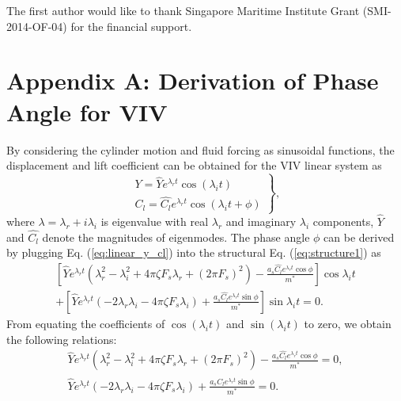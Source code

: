 \documentclass{jfm}
\begin{document}
The first author would like to thank Singapore Maritime Institute Grant (SMI-2014-OF-04) 
for the financial support.

\appendix
\renewcommand\thefigure{B.\arabic{figure}}
\renewcommand{\theequation}{A.\arabic{equation}}
\section*{Appendix A: Derivation of Phase Angle for VIV}
By considering the cylinder motion and fluid forcing as sinusoidal functions, the displacement and lift coefficient can be obtained  for the VIV linear system as
\begin{equation}
\left. \begin{array}{ll}
\displaystyle Y=\hat{Y} e^{\lambda_r t}\cos(\lambda_i t)  \\[8pt]
\displaystyle C_l=\hat{C_l} e^{\lambda_r t}\cos(\lambda_i t + \phi)
\end{array}\right\},
\label{eq:linear_y_cl}
\end{equation}
where $\lambda=\lambda_r+i\lambda_i$ is eigenvalue with real $\lambda_r$ 
and imaginary $\lambda_i$ components, $\hat{Y}$ and $\hat{C_l}$ 
denote the magnitudes of eigenmodes. The phase angle $\phi$ can be derived by plugging Eq. (\ref{eq:linear_y_cl}) 
into the structural Eq. (\ref{eq:structure1}) as
\begin{equation}
\begin{array}{cc}
[\hat{Y}e^{\lambda_r t} (\lambda_r^2 - \lambda_i^2 + 4 \pi \zeta F_s \lambda_r + (2 \pi F_s)^2) 
- \frac{a_s \hat{C_l} e^{\lambda_r t} \cos{\phi}}{m^*}] \cos{\lambda_i t} \\
+ [\hat{Y}e^{\lambda_r t}(-2 \lambda_r \lambda_i - 4 \pi \zeta F_s \lambda_i) + 
 \frac{a_s \hat{C_l} e^{\lambda_r t} \sin{\phi}}{m^*}] \sin{\lambda_i t} = 0.
\end{array}
\label{eq:phase1}
\end{equation}
From equating the coefficients of $\cos(\lambda_i t)$ and $\sin(\lambda_i t)$ to zero, 
we obtain the following relations:
\begin{equation}
\begin{array}{cc}
\hat{Y}e^{\lambda_r t} (\lambda_r^2 - \lambda_i^2 + 4 \pi \zeta F_s \lambda_r + (2 \pi F_s)^2) 
- \frac{a_s \hat{C_l} e^{\lambda_r t} \cos{\phi}}{m^*} = 0, \\
\hat{Y}e^{\lambda_r t}(-2 \lambda_r \lambda_i - 4 \pi \zeta F_s \lambda_i) + 
 \frac{a_s \hat{C_l} e^{\lambda_r t} \sin{\phi}}{m^*} = 0.
\end{array}
\label{eq:phase2}
\end{equation}
\end{document}

